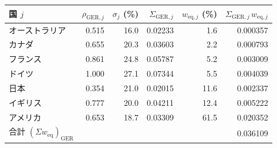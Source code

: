 \begin{tabular}{lrrrrr}
\toprule
国 $j$ & $\rho_{\mathrm{GER},j}$ & $\sigma_j$ (\%) & $\Sigma_{\mathrm{GER},j}$ & $w_{\mathrm{eq},j}$ (\%) & $\Sigma_{\mathrm{GER},j}\,w_{\mathrm{eq},j}$ \\
\midrule
オーストラリア & 0.515 & 16.0 & 0.02233 & 1.6 & 0.000357 \\
カナダ & 0.655 & 20.3 & 0.03603 & 2.2 & 0.000793 \\
フランス & 0.861 & 24.8 & 0.05787 & 5.2 & 0.003009 \\
ドイツ & 1.000 & 27.1 & 0.07344 & 5.5 & 0.004039 \\
日本 & 0.354 & 21.0 & 0.02015 & 11.6 & 0.002337 \\
イギリス & 0.777 & 20.0 & 0.04211 & 12.4 & 0.005222 \\
アメリカ & 0.653 & 18.7 & 0.03309 & 61.5 & 0.020352 \\
\midrule
合計 $(\Sigma w_{\mathrm{eq}})_{\mathrm{GER}}$ &  &  &  &  & 0.036109 \\
\bottomrule
\end{tabular}
